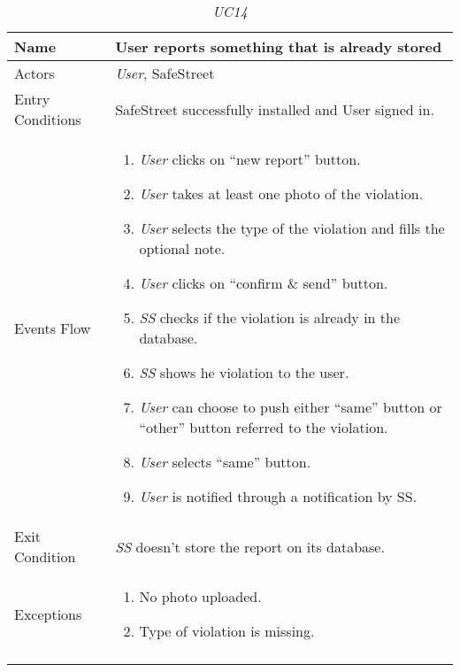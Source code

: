 \documentclass[../../../RASD.tex]{subfiles}
\begin{document}
    \begin{center}
    \begin{longtable}{| p{.35\linewidth} | p{.65\linewidth} |}
    \hline
    \textbf{Name} & \textbf{User reports something that is already stored}\\ \hline
    Actors & \textit{User}, SafeStreet\\ \hline
    Entry Conditions & SafeStreet successfully installed and User signed in.\\ \hline
    Events Flow &
    \begin{enumerate}
    \item \textit{User} clicks on “new report” button.
    \item \textit{User} takes at least one photo of the violation.
    \item \textit{User} selects the type of the violation and fills the optional note.
    \item \textit{User} clicks on “confirm \& send” button.
    \item \textit{ SS} checks if the violation is already in the database.
    \item \textit{SS} shows he violation to the user.
        \item \textit{User} can choose to push either “same” button or “other” button referred to the violation.
        \item \textit{User} selects “same” button.
        \item \textit{User} is notified through a notification by SS.
    \end{enumerate}
    \\ \hline
    Exit Condition & \textit{SS} doesn't store the report on its database.\\ \hline
    Exceptions &
    \begin{enumerate}
    \item No photo uploaded.
        \item Type of violation is missing.
    \end{enumerate}
    \\
    \hline
    \caption[\textit{Use Case 14}]{\textit{UC14}}
    \end{longtable}
    \end{center}
\end{document}
